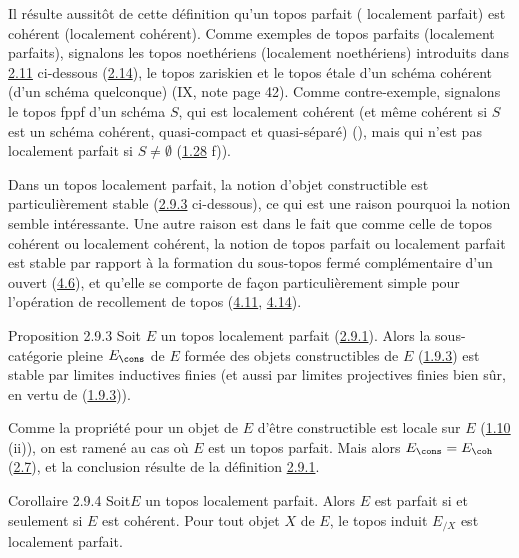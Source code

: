 Il résulte aussitôt de cette définition qu'un topos parfait (\resp
localement parfait) est cohérent (\resp localement cohérent). Comme
exemples de topos parfaits (\resp localement parfaits), signalons
les topos noethériens (\resp localement noethériens) introduits dans
\hyperref[VI.def2.11]{2.11} ci-dessous (\cf \hyperref[VI.subsec2.14]{2.14}), le topos
zariskien et le topos étale d'un schéma cohérent (\resp d'un schéma
quelconque) (IX, note page 42). Comme contre-exemple,\pageoriginale
signalons le topos fppf d'un schéma $S$, qui est localement cohérent
(et même cohérent si $S$ est un schéma cohérent, \ie quasi-compact
et quasi-séparé) (), mais qui n'est pas localement
parfait si $S \neq ∅$ (\hyperref[VI.exer1.28]{1.28} f)).

Dans un topos localement parfait, la notion d'objet constructible
est particulièrement stable (\hyperref[VI.prop2.9.3]{2.9.3} ci-dessous), ce qui
est une raison pourquoi la notion semble intéressante. Une autre
raison est dans le fait que comme celle de topos cohérent ou
localement cohérent, la notion de topos parfait ou localement
parfait est stable par rapport à la formation du sous-topos fermé
complémentaire d'un ouvert (\hyperref[VI.prop4.6]{4.6}), et qu'elle se
comporte de façon particulièrement simple pour l'opération de
recollement de topos (\hyperref[VI.cor4.11]{4.11}, \hyperref[VI.cor4.14]{4.14}).

\begin{enonce*}{Proposition 2.9.3}
Soit $E$ un topos localement parfait (\hyperref[VI.def2.9.1]{2.9.1}). Alors la
sous-catégorie
pleine $E_{\cons}$ de $E$ formée des objets constructibles de $E$
(\hyperref[VI.subsubsec1.9.3]{1.9.3}) est stable par limites inductives finies (et
aussi par limites
projectives finies bien sûr, en vertu de (\hyperref[VI.subsubsec1.9.3]{1.9.3})).
\end{enonce*}

Comme la propriété pour un objet de $E$ d'être constructible est
locale sur $E$ (\hyperref[VI.prop1.10]{1.10} (ii)), on est ramené au cas
où $E$ est un topos
parfait. Mais alors $E_{\cons} = E_{\coh}$ (\hyperref[VI.cor2.7]{2.7}), et la conclusion
résulte de la définition \hyperref[VI.def2.9.1]{2.9.1}.

\begin{enonce*}{Corollaire 2.9.4}
Soit\pageoriginale $E$ un topos localement parfait. Alors $E$ est parfait si et
seulement si $E$ est cohérent. Pour tout objet $X$ de $E$, le topos
induit $E_{/X}$ est localement parfait.
\end{enonce*}

